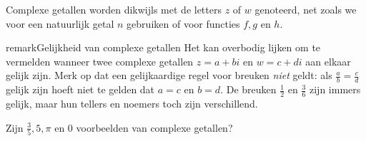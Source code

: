 \documentclass{ximera}
\begin{document}
    Complexe getallen worden dikwijls met de letters \(z\) of \(w\) genoteerd, net zoals we voor een natuurlijk getal \(n\) gebruiken of voor functies \(f, g \) en \(h\).

\begin{expandable}{remark}{Gelijkheid van complexe getallen}
    Het kan overbodig lijken om te vermelden wanneer twee complexe getallen \(z = a+bi\) en \(w = c+di\) aan elkaar gelijk zijn. Merk op dat een gelijkaardige regel voor breuken \textit{niet} geldt: als $\frac{a}{b} = \frac{c}{d}$ gelijk zijn hoeft niet te gelden dat \(a = c\) en \(b = d\). De breuken $\frac{1}{2}$ en $\frac{3}{6}$ zijn immers gelijk, maar hun tellers en noemers toch zijn verschillend. 
\end{expandable}


\begin{quickquestion*}\nl
Zijn \( \frac{3}{5}, 5, \pi \text{ en } 0 \) voorbeelden van complexe getallen? 
\end{quickquestion*}



\end{document}
